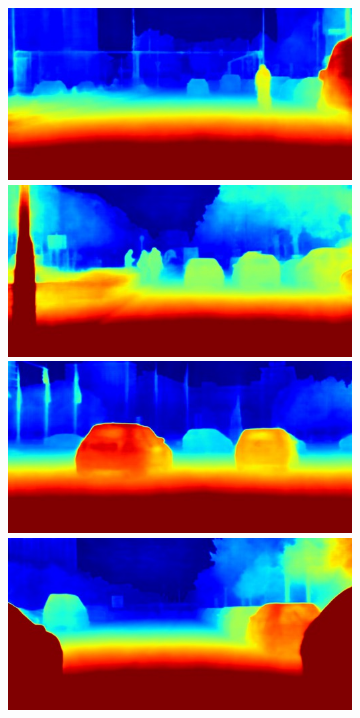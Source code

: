 {\begin{figure}[t]
{{\begin{subfigure}[t]{0.24\linewidth}
\begin{center}
		\includegraphics[width=\linewidth,trim={0px 60px 0 0px},clip]{qualitative/berlin_000010_000019_depth_prediction.jpg}
		\includegraphics[width=\linewidth,trim={0px 60px 0 0px},clip]{qualitative/berlin_000036_000019_depth_prediction.jpg}
		\includegraphics[width=\linewidth,trim={0px 60px 0 0px},clip]{qualitative/berlin_000046_000019_depth_prediction.jpg}
		\includegraphics[width=\linewidth,trim={0px 60px 0 0px},clip]{qualitative/berlin_000049_000019_depth_prediction.jpg}

\end{center}
\end{subfigure}}}
\end{figure}}
